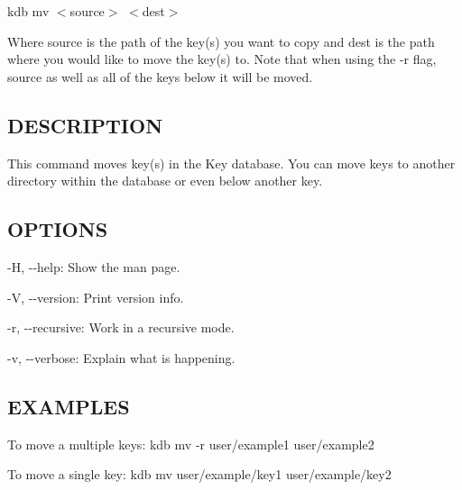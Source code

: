 {\ttfamily kdb mv $<$source$>$ $<$dest$>$}

Where {\ttfamily source} is the path of the key(s) you want to copy and {\ttfamily dest} is the path where you would like to move the key(s) to. Note that when using the {\ttfamily -\/r} flag, {\ttfamily source} as well as all of the keys below it will be moved.

\subsection*{D\+E\+S\+C\+R\+I\+P\+T\+I\+O\+N}

This command moves key(s) in the Key database. You can move keys to another directory within the database or even below another key.

\subsection*{O\+P\+T\+I\+O\+N\+S}


\begin{DoxyItemize}
\item {\ttfamily -\/\+H}, {\ttfamily -\/-\/help}\+: Show the man page.
\item {\ttfamily -\/\+V}, {\ttfamily -\/-\/version}\+: Print version info.
\item {\ttfamily -\/r}, {\ttfamily -\/-\/recursive}\+: Work in a recursive mode.
\item {\ttfamily -\/v}, {\ttfamily -\/-\/verbose}\+: Explain what is happening.
\end{DoxyItemize}

\subsection*{E\+X\+A\+M\+P\+L\+E\+S}

To move a multiple keys\+: {\ttfamily kdb mv -\/r user/example1 user/example2}

To move a single key\+: {\ttfamily kdb mv user/example/key1 user/example/key2} 